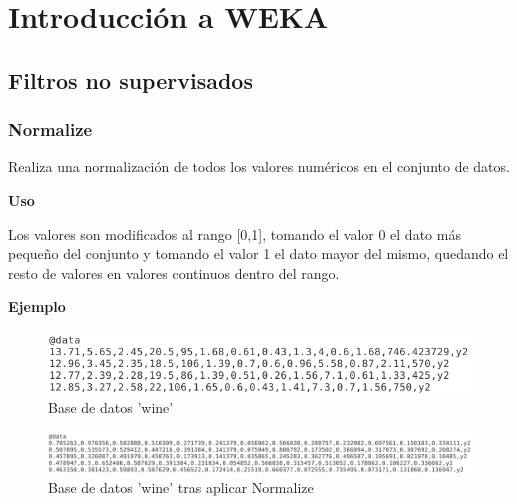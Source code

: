 \chapter{Introducción a WEKA}



\section{Filtros no supervisados}
	
	\newpage

	\subsection{Normalize}

	Realiza una normalización de todos los valores numéricos en el conjunto de datos. 

	
	\begin{justify}
	\textbf{Uso}
	\end{justify}
		
	Los valores son modificados al rango [0,1], tomando el valor 0 el dato más pequeño del conjunto y tomando el valor 1 el dato mayor del mismo, quedando el resto de valores en valores continuos dentro del rango.

	
	\begin{justify}
	\textbf{Ejemplo}
	\end{justify}


	\begin{figure}[!htp]
	\centering
	\includegraphics[scale=.32]{./figuras/image22.png}
	\caption{Base de datos 'wine'}
	\end{figure}
	
	\begin{figure}[!htp]
	\centering
	\includegraphics[scale=.32]{./figuras/image21.png}
	\caption{Base de datos 'wine' tras aplicar Normalize}
	\end{figure}

